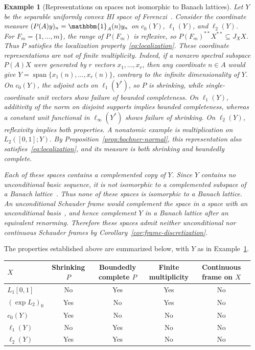 \documentclass[11pt,leqno]{amsart}
\theoremstyle{compact}
\numberwithin{equation}{section}
\theoremstyle{compactremark}
\newtheorem{example}[theorem]{Example}
\theoremstyle{compact}
\DeclareMathOperator{\spn}{span}
\newcommand{\1}{\mathbbm{1}}
\begin{document}
\begin{example}[Representations on spaces not isomorphic to Banach lattices]\label{ex:vector-sequences}
Let $Y$ be the separable uniformly convex HI space of Ferenczi~\cite{Ferenczi1997}. Consider the coordinate measure $(P(A)y)_n=\1_A(n)y_n$ on $c_0(Y)$, $\ell_1(Y)$, and $\ell_2(Y)$. For $F_m=\{1,\ldots,m\}$, the range of $P(F_m)$ is reflexive, so $P(F_m)^{**}X^{**}\subseteq J_XX$. Thus $P$ satisfies the localization property~\eqref{eq:localization}. These coordinate representations are not of finite multiplicity. Indeed, if a nonzero spectral subspace $P(A)X$ were generated by $r$ vectors $x_1,\ldots,x_r$, then any coordinate $n\in A$ would give $Y=\spn\{x_1(n),\ldots,x_r(n)\}$, contrary to the infinite dimensionality of $Y$. On $c_0(Y)$, the adjoint acts on $\ell_1(Y^*)$, so $P$ is shrinking, while single-coordinate unit vectors show failure of bounded completeness. On $\ell_1(Y)$, additivity of the norm on disjoint supports implies bounded completeness, whereas a constant unit functional in $\ell_\infty(Y^*)$ shows failure of shrinking. On $\ell_2(Y)$, reflexivity implies both properties. A nonatomic example is multiplication on $L_2([0,1];Y)$. By Proposition~\ref{prop:bochner-normal}, this representation also satisfies~\eqref{eq:localization}, and its measure is both shrinking and boundedly complete.

Each of these spaces contains a complemented copy of $Y$. Since $Y$ contains no unconditional basic sequence, it is not isomorphic to a complemented subspace of a Banach lattice~\cite[Section~1]{DeHeviaTradacete2025}. Thus none of these spaces is isomorphic to a Banach lattice. An unconditional Schauder frame would complement the space in a space with an unconditional basis~\cite[Proposition~1.6]{HanLarsonLiuLiu2014}, and hence complement $Y$ in a Banach lattice after an equivalent renorming. Therefore these spaces admit neither unconditional nor continuous Schauder frames by Corollary~\ref{cor:frame-discretization}.
\end{example}

\begingroup
The properties established above are summarized below, with $Y$ as in Example~\ref{ex:vector-sequences}.
\begin{center}
\small
\begin{tabular}{lcccc}
\hline
$X$ & \shortstack{Shrinking\\$P$} & \shortstack{Boundedly\\complete $P$} & \shortstack{Finite\\multiplicity} & \shortstack{Continuous\\frame on $X$}\\
\hline
$L_1[0,1]$ & No & Yes & Yes & No\\
$(\exp L_2)_0$ & Yes & No & Yes & No\\
$c_0(Y)$ & Yes & No & No & No\\
$\ell_1(Y)$ & No & Yes & No & No\\
$\ell_2(Y)$ & Yes & Yes & No & No\\
\hline
\end{tabular}
\end{center}
\par\endgroup
\end{document}
